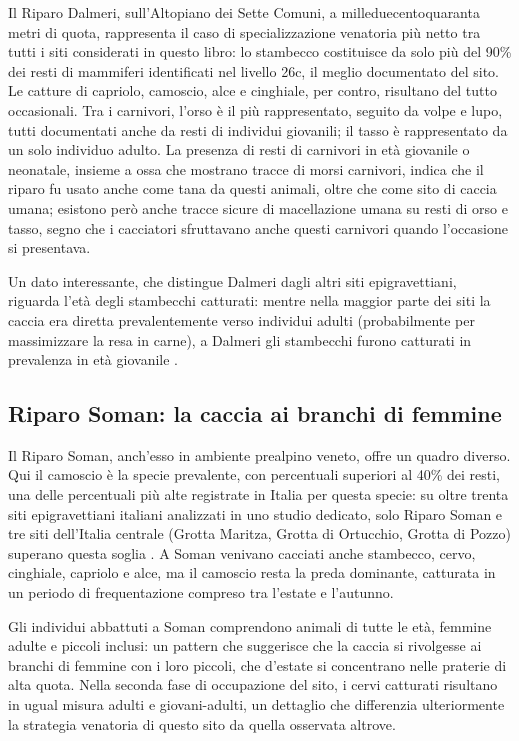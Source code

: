 Il Riparo Dalmeri, sull'Altopiano dei Sette Comuni, a milleduecentoquaranta metri di quota, rappresenta il caso di specializzazione venatoria più netto tra tutti i siti considerati in questo libro: lo stambecco costituisce da solo più del 90\% dei resti di mammiferi identificati nel livello 26c, il meglio documentato del sito. Le catture di capriolo, camoscio, alce e cinghiale, per contro, risultano del tutto occasionali. Tra i carnivori, l'orso è il più rappresentato, seguito da volpe e lupo, tutti documentati anche da resti di individui giovanili; il tasso è rappresentato da un solo individuo adulto. La presenza di resti di carnivori in età giovanile o neonatale, insieme a ossa che mostrano tracce di morsi carnivori, indica che il riparo fu usato anche come tana da questi animali, oltre che come sito di caccia umana; esistono però anche tracce sicure di macellazione umana su resti di orso e tasso, segno che i cacciatori sfruttavano anche questi carnivori quando l'occasione si presentava.

Un dato interessante, che distingue Dalmeri dagli altri siti epigravettiani, riguarda l'età degli stambecchi catturati: mentre nella maggior parte dei siti la caccia era diretta prevalentemente verso individui adulti (probabilmente per massimizzare la resa in carne), a Dalmeri gli stambecchi furono catturati in prevalenza in età giovanile \citep{fioretagliacozzo2005}.

\subsection{Riparo Soman: la caccia ai branchi di femmine}

Il Riparo Soman, anch'esso in ambiente prealpino veneto, offre un quadro diverso. Qui il camoscio è la specie prevalente, con percentuali superiori al 40\% dei resti, una delle percentuali più alte registrate in Italia per questa specie: su oltre trenta siti epigravettiani italiani analizzati in uno studio dedicato, solo Riparo Soman e tre siti dell'Italia centrale (Grotta Maritza, Grotta di Ortucchio, Grotta di Pozzo) superano questa soglia \citep{deangelis2021}. A Soman venivano cacciati anche stambecco, cervo, cinghiale, capriolo e alce, ma il camoscio resta la preda dominante, catturata in un periodo di frequentazione compreso tra l'estate e l'autunno.

Gli individui abbattuti a Soman comprendono animali di tutte le età, femmine adulte e piccoli inclusi: un pattern che suggerisce che la caccia si rivolgesse ai branchi di femmine con i loro piccoli, che d'estate si concentrano nelle praterie di alta quota. Nella seconda fase di occupazione del sito, i cervi catturati risultano in ugual misura adulti e giovani-adulti, un dettaglio che differenzia ulteriormente la strategia venatoria di questo sito da quella osservata altrove.

